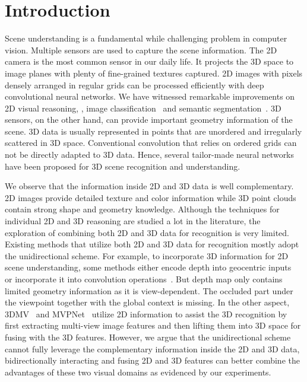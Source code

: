 \documentclass[final]{cvpr}
\begin{document}
\vspace{-4mm}
\section{Introduction}
\label{sec:introduction}
Scene understanding is a fundamental while challenging problem in computer vision. Multiple sensors are used to capture the scene information. 
The 2D camera is the most common sensor in our daily life. It projects the 3D space to image planes with plenty of fine-grained textures captured. 2D images with pixels densely arranged in regular grids can be processed efficiently with deep convolutional neural networks. We have witnessed remarkable improvements on 2D visual reasoning, \eg, image classification~\cite{krizhevsky2012imagenet,szegedy2015going,simonyan2015very,he2016deep} and semantic segmentation~\cite{long2015fully,chen2015semantic,yu2016multi,zhao2017pyramid}. 
3D sensors, on the other hand, can provide important geometry information of the scene. 3D data is usually represented in points that are unordered and irregularly scattered in 3D space. Conventional convolution that relies on ordered grids can not be directly adapted to 3D data.
Hence, several tailor-made neural networks~\cite{qi2017pointnet,li2018pointcnn,sscn2018} have been proposed for 3D scene recognition and understanding.


We observe that the information inside 2D and 3D data is well complementary. 2D images provide detailed texture and color information while 3D point clouds contain strong shape and geometry knowledge.  
Although the techniques for individual 2D and 3D reasoning are studied a lot in the literature, the exploration of combining both 2D and 3D data for recognition is very limited. 
Existing methods that utilize both 2D and 3D data for recognition mostly adopt the unidirectional scheme.
For example, to incorporate 3D information for 2D scene understanding, some methods either encode depth into geocentric inputs~\cite{gupta2014learning} or incorporate it into convolution operations~\cite{qi20173d,wang2018depth}. 
But depth map only contains limited geometry information as it is view-dependent. The occluded part under the viewpoint together with the global context is missing. 
In the other aspect, 3DMV~\cite{dai20183dmv} and MVPNet~\cite{jaritz2019multi} utilize 2D information to assist the 3D recognition by first extracting multi-view image features and then lifting them into 3D space for fusing with the 3D features. 
However, we argue that the unidirectional scheme cannot fully leverage the complementary information inside the 2D and 3D data, bidirectionally interacting and fusing 2D and 3D features can better combine the advantages of these two visual domains as evidenced by our experiments.
\end{document}
